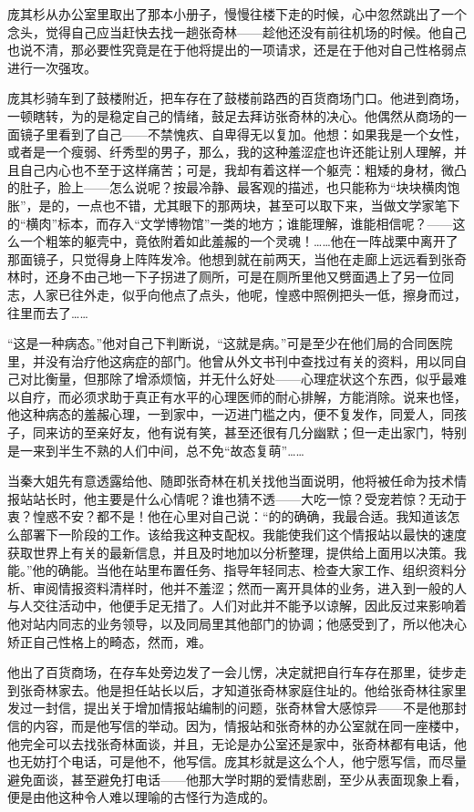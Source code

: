 \par 庞其杉从办公室里取出了那本小册子，慢慢往楼下走的时候，心中忽然跳出了一个念头，觉得自己应当赶快去找一趟张奇林——趁他还没有前往机场的时候。他自己也说不清，那必要性究竟是在于他将提出的一项请求，还是在于他对自己性格弱点进行一次强攻。
\par 庞其杉骑车到了鼓楼附近，把车存在了鼓楼前路西的百货商场门口。他进到商场，一顿瞎转，为的是稳定自己的情绪，鼓足去拜访张奇林的决心。他偶然从商场的一面镜子里看到了自己——不禁愧疚、自卑得无以复加。他想：如果我是一个女性，或者是一个瘦弱、纤秀型的男子，那么，我的这种羞涩症也许还能让别人理解，并且自己内心也不至于这样痛苦；可是，我却有着这样一个躯壳：粗矮的身材，微凸的肚子，脸上——怎么说呢？按最冷静、最客观的描述，也只能称为“块块横肉饱胀”，是的，一点也不错，尤其眼下的那两块，甚至可以取下来，当做文学家笔下的“横肉”标本，而存入“文学博物馆”一类的地方；谁能理解，谁能相信呢？——这么一个粗笨的躯壳中，竟依附着如此羞赧的一个灵魂！……他在一阵战栗中离开了那面镜子，只觉得身上阵阵发冷。他想到就在前两天，当他在走廊上远远看到张奇林时，还身不由己地一下子拐进了厕所，可是在厕所里他又劈面遇上了另一位同志，人家已往外走，似乎向他点了点头，他呢，惶惑中照例把头一低，擦身而过，往里而去了……
\par “这是一种病态。”他对自己下判断说，“这就是病。”可是至少在他们局的合同医院里，并没有治疗他这病症的部门。他曾从外文书刊中查找过有关的资料，用以同自己对比衡量，但那除了增添烦恼，并无什么好处——心理症状这个东西，似乎最难以自疗，而必须求助于真正有水平的心理医师的耐心排解，方能消除。说来也怪，他这种病态的羞赧心理，一到家中，一迈进门槛之内，便不复发作，同爱人，同孩子，同来访的至亲好友，他有说有笑，甚至还很有几分幽默；但一走出家门，特别是一来到半生不熟的人们中间，总不免“故态复萌”……
\par 当秦大姐先有意透露给他、随即张奇林在机关找他当面说明，他将被任命为技术情报站站长时，他主要是什么心情呢？谁也猜不透——大吃一惊？受宠若惊？无动于衷？惶惑不安？都不是！他在心里对自己说：“的的确确，我最合适。我知道该怎么部署下一阶段的工作。该给我这种支配权。我能使我们这个情报站以最快的速度获取世界上有关的最新信息，并且及时地加以分析整理，提供给上面用以决策。我能。”他的确能。当他在站里布置任务、指导年轻同志、检查大家工作、组织资料分析、审阅情报资料清样时，他并不羞涩；然而一离开具体的业务，进入到一般的人与人交往活动中，他便手足无措了。人们对此并不能予以谅解，因此反过来影响着他对站内同志的业务领导，以及同局里其他部门的协调；他感受到了，所以他决心矫正自己性格上的畸态，然而，难。
\par 他出了百货商场，在存车处旁边发了一会儿愣，决定就把自行车存在那里，徒步走到张奇林家去。他是担任站长以后，才知道张奇林家庭住址的。他给张奇林往家里发过一封信，提出关于增加情报站编制的问题，张奇林曾大感惊异——不是他那封信的内容，而是他写信的举动。因为，情报站和张奇林的办公室就在同一座楼中，他完全可以去找张奇林面谈，并且，无论是办公室还是家中，张奇林都有电话，他也无妨打个电话，可是他不，他写信。庞其杉就是这么个人，他宁愿写信，而尽量避免面谈，甚至避免打电话——他那大学时期的爱情悲剧，至少从表面现象上看，便是由他这种令人难以理喻的古怪行为造成的。
